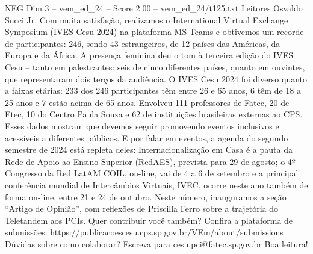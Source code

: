 \begin{textsample}{NEG Dim 3 – vem\_ed\_24 – Score 2.00 – vem\_ed\_24/t125.txt}  \label{ex:f3_neg_100}
Leitores Osvaldo Succi Jr.
Com muita satisfação, realizamos o International Virtual Exchange Symposium (IVES Cesu 2024) na plataforma MS Teams e obtivemos um recorde de participantes: 246, sendo 43 estrangeiros, de 12 países das Américas, da Europa e da África.
A presença feminina deu o tom à terceira edição do IVES Cesu – tanto em palestrantes: seis de cinco diferentes países, quanto em ouvintes, que representaram dois terços da audiência.
O IVES Cesu 2024 foi diverso quanto a faixas etárias: 233 dos 246 participantes têm entre 26 e 65 anos, 6 têm de 18 a 25 anos e 7 estão acima de 65 anos.
Envolveu 111 professores de Fatec, 20 de Etec, 10 do Centro Paula Souza e 62 de instituições brasileiras externas ao CPS.
Esses dados mostram que devemos seguir promovendo eventos inclusivos e acessíveis a diferentes públicos.
E por falar em eventos, a agenda do segundo semestre de 2024 está repleta deles: Internacionalização em Casa é a pauta da Rede de Apoio ao Ensino Superior (RedAES), prevista para 29 de agosto; o 4º Congresso da Red LatAM COIL, on-line, vai de 4 a 6 de setembro e a principal conferência mundial de Intercâmbios Virtuais, IVEC, ocorre neste ano também de forma on-line, entre 21 e 24 de outubro.
Neste número, inauguramos a seção “Artigo de Opinião”, com reflexões de Priscilla Ferro sobre a trajetória do Teletandem aos PCIs.
Quer contribuir você também?
Confira a plataforma de submissões: https://publicacoescesu.cps.sp.gov.br/VEm/about/submissions Dúvidas sobre como colaborar?
Escreva para cesu.pci@fatec.sp.gov.br Boa leitura!

\end{textsample}
